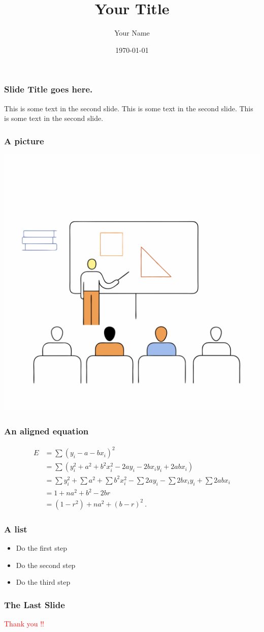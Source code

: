 \documentclass{beamer}
\title{Your Title}
\author{Your Name}
\date{\today}
\begin{document}
\frame{\titlepage}

\begin{frame}
\frametitle{Slide Title goes here.}
This is some text in the second slide. This is some text in the second slide. This is some text in the second slide.
\end{frame}

\begin{frame}
\frametitle{A picture}
\begin{center}
\vfill
\includegraphics[scale=0.03]{momo.png}
\vfill
\end{center}
\end{frame}

\begin{frame}
\frametitle{An aligned equation}
\begin{align*}
E &= \sum (y_i - a - bx_i)^2 \\
&= \sum (y_i^2 + a^2 + b^2 x_i^2 - 2ay_i - 2bx_iy_i + 2abx_i) \\
&= \sum y_i^2 + \sum a^2 + \sum b^2 x_i^2 
 - \sum 2ay_i - \sum 2bx_iy_i + \sum 2abx_i \\
&= 1 + na^2 + b^2 - 2br \\
&= (1-r^2) + na^2 + (b - r)^2\ .
\end{align*}
\end{frame}

\begin{frame}
\frametitle{A list}
\begin{itemize}
\item Do the first step
\item Do the second step
\item Do the third step
\end{itemize}
\end{frame}

\begin{frame}
\frametitle{The Last Slide}
\begin{center}
{\Huge\textcolor{red}{Thank you !!}}
\end{center}
\end{frame}
\end{document}
